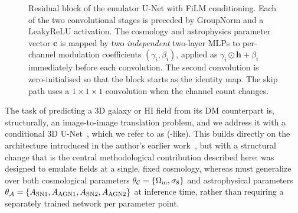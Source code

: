 \begin{figure}[h!]
{}
  \caption[FiLM-conditioned residual block]{%
    Residual block of the emulator U-Net with FiLM conditioning. Each of the two
    convolutional stages is preceded by \mbox{GroupNorm} and a LeakyReLU
    activation. The cosmology and astrophysics parameter vector $\bm{c}$ is mapped by two
    \emph{independent} two-layer MLPs to per-channel modulation coefficients
    $(\gamma_i,\beta_i)$, applied as $\gamma_i\odot\bm{h}+\beta_i$ immediately
    before each convolution. The second convolution is zero-initialised
    so that the block starts as the identity map. The skip path uses a $1\times1\times1$
    convolution when the channel count changes.}
  \label{fig:film_resnet_block}
\end{figure}



The task of predicting a 3D galaxy or HI field from its DM counterpart is,
structurally, an image-to-image translation problem, and we address it with
a conditional 3D U-Net~\citep{ronneberger_u-net_2015},
which we refer to as \HGL (\HALOgen-like). This builds directly on the
\HALOgen architecture introduced in the author's earlier
work~\citep{mishra2025largefastaccuratehi}, but with a structural change that is the central
methodological contribution described here: \HALOgen was designed to emulate
fields at a single, fixed cosmology, whereas \HGL must generalize over both
cosmological parameters $\theta_{\mathcal{C}} = \{\Omega_\mathrm{m}, \sigma_8\}$ and
astrophysical parameters
$\theta_{\mathcal{A}} = \{A_{\rm SN1}, A_{\rm AGN1}, A_{\rm SN2}, A_{\rm AGN2}\}$
at inference time, rather than requiring a separately trained network per
parameter point.

